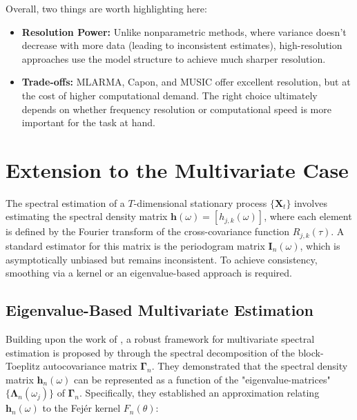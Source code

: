 \documentclass[twoside]{article}
\begin{document}
Overall, two things are worth highlighting here:
\begin{itemize}
\item \textbf{Resolution Power:} Unlike nonparametric methods, where variance doesn't decrease with more data (leading to inconsistent estimates), high-resolution approaches use the model structure to achieve much sharper resolution.
\item \textbf{Trade-offs:} MLARMA, Capon, and MUSIC offer excellent resolution, but at the cost of higher computational demand. The right choice ultimately depends on whether frequency resolution or computational speed is more important for the task at hand.
\end{itemize}



\section{Extension to the Multivariate Case}
The spectral estimation of a $T$-dimensional stationary process $\{\mathbf{X}_t\}$ involves estimating the spectral density matrix $\mathbf{h}(\omega) = [h_{j,k}(\omega)]$, where each element is defined by the Fourier transform of the cross-covariance function $R_{j,k}(\tau)$. A standard estimator for this matrix is the periodogram matrix $\mathbf{I}_n(\omega)$, which is asymptotically unbiased but remains inconsistent. To achieve consistency, smoothing via a kernel or an eigenvalue-based approach is required.



\subsection{Eigenvalue-Based Multivariate Estimation}



Building upon the work of \cite{SubbaRaoGabr:1989}, a robust framework for multivariate spectral estimation is proposed by \cite{NematollahiSubbaRao:2005} through the spectral decomposition of the block-Toeplitz autocovariance matrix $\mathbf{\Gamma}_n$. They demonstrated that the spectral density matrix $\mathbf{h}_n(\omega)$ can be represented as a function of the "eigenvalue-matrices" $\{\mathbf{\Lambda}_n(\omega_j)\}$ of $\mathbf{\Gamma}_n$. Specifically, they established an approximation relating $\mathbf{h}_n(\omega)$ to the Fejér kernel $F_n(\theta)$:
\end{document}
